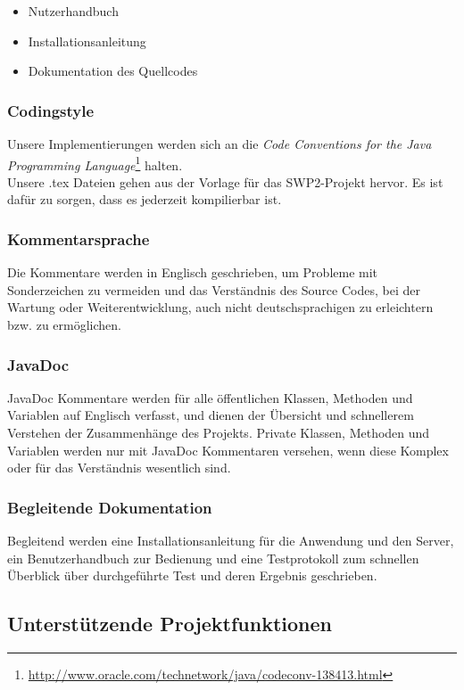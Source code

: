 \documentclass[fontsize=12pt,paper=a4,twoside]{scrartcl}
\begin{document}
\begin{itemize}
\item{Nutzerhandbuch}
\item{Installationsanleitung}
\item{Dokumentation des Quellcodes}
\end{itemize}

\subsubsection{Codingstyle}
Unsere Implementierungen werden sich an die \emph{Code Conventions for the Java Programming Language}\footnote{\url{http://www.oracle.com/technetwork/java/codeconv-138413.html}} halten.\\
Unsere .tex Dateien gehen aus der Vorlage für das SWP2-Projekt hervor. Es ist dafür zu sorgen, dass es jederzeit kompilierbar ist.


\subsubsection{Kommentarsprache}

Die Kommentare werden in Englisch geschrieben, um Probleme mit Sonderzeichen zu vermeiden und das Verständnis des Source Codes, bei der Wartung oder Weiterentwicklung, auch nicht deutschsprachigen zu erleichtern bzw. zu ermöglichen.

\subsubsection{JavaDoc}

JavaDoc Kommentare werden für alle öffentlichen Klassen, Methoden und Variablen auf Englisch verfasst, und dienen der Übersicht und schnellerem Verstehen der Zusammenhänge des Projekts.
Private Klassen, Methoden und Variablen werden nur mit JavaDoc Kommentaren versehen, wenn diese Komplex oder für das Verständnis wesentlich sind.

\subsubsection{Begleitende Dokumentation}

Begleitend werden eine Installationsanleitung für die Anwendung und den Server, ein Benutzerhandbuch zur Bedienung und eine Testprotokoll zum schnellen Überblick über durchgeführte Test und deren Ergebnis geschrieben.

\subsection{Unterstützende Projektfunktionen}
\end{document}
